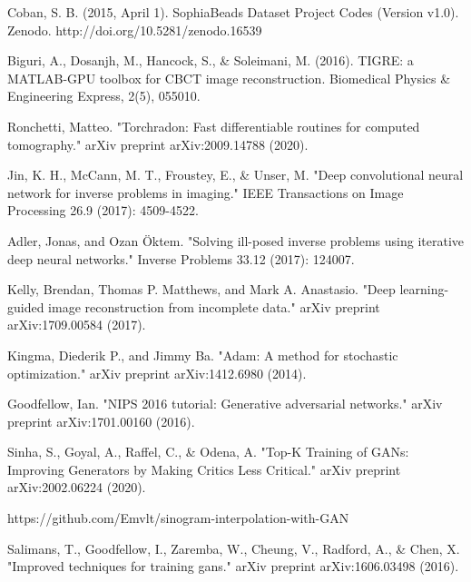 \begin{thebibliography}{00}
Coban, S. B. (2015, April 1). SophiaBeads Dataset Project Codes (Version v1.0). Zenodo. http://doi.org/10.5281/zenodo.16539

 Biguri, A., Dosanjh, M., Hancock, S., \& Soleimani, M. (2016). TIGRE: a MATLAB-GPU toolbox for CBCT image reconstruction. Biomedical Physics \& Engineering Express, 2(5), 055010.

Ronchetti, Matteo. "Torchradon: Fast differentiable routines for computed tomography." arXiv preprint arXiv:2009.14788 (2020).

Jin, K. H., McCann, M. T., Froustey, E., \& Unser, M. "Deep convolutional neural network for inverse problems in imaging." IEEE Transactions on Image Processing 26.9 (2017): 4509-4522.

Adler, Jonas, and Ozan Öktem. "Solving ill-posed inverse problems using iterative deep neural networks." Inverse Problems 33.12 (2017): 124007.

Kelly, Brendan, Thomas P. Matthews, and Mark A. Anastasio. "Deep learning-guided image reconstruction from incomplete data." arXiv preprint arXiv:1709.00584 (2017).

Kingma, Diederik P., and Jimmy Ba. "Adam: A method for stochastic optimization." arXiv preprint arXiv:1412.6980 (2014).

Goodfellow, Ian. "NIPS 2016 tutorial: Generative adversarial networks." arXiv preprint arXiv:1701.00160 (2016).

Sinha, S., Goyal, A., Raffel, C., \& Odena, A.  "Top-K Training of GANs: Improving Generators by Making Critics Less Critical." arXiv preprint arXiv:2002.06224 (2020).

 https://github.com/Emvlt/sinogram-interpolation-with-GAN

Salimans, T., Goodfellow, I., Zaremba, W., Cheung, V., Radford, A., \& Chen, X. "Improved techniques for training gans." arXiv preprint arXiv:1606.03498 (2016).

\end{thebibliography}